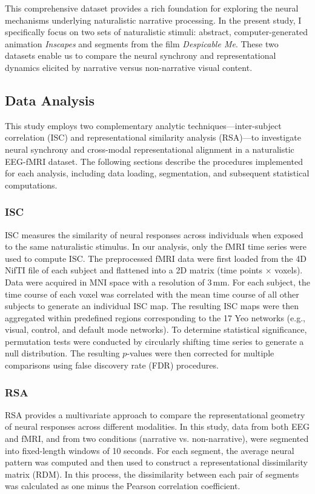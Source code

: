 \documentclass[stu,12pt,floatsintext]{apa7}
\begin{document}
This comprehensive dataset provides a rich foundation for exploring the neural mechanisms underlying naturalistic narrative processing. In the present study, I specifically focus on two sets of naturalistic stimuli: abstract, computer-generated animation \textit{Inscapes} and segments from the film \textit{Despicable Me}. These two datasets enable us to compare the neural synchrony and representational dynamics elicited by narrative versus non-narrative visual content.

\subsection{Data Analysis}
This study employs two complementary analytic techniques—inter-subject correlation (ISC) and representational similarity analysis (RSA)—to investigate neural synchrony and cross-modal representational alignment in a naturalistic EEG-fMRI dataset. The following sections describe the procedures implemented for each analysis, including data loading, segmentation, and subsequent statistical computations.

\subsubsection{ISC}
ISC measures the similarity of neural responses across individuals when exposed to the same naturalistic stimulus. In our analysis, only the fMRI time series were used to compute ISC. The preprocessed fMRI data were first loaded from the 4D NifTI file of each subject and flattened into a 2D matrix (time points $\times$ voxels). Data were acquired in MNI space with a resolution of 3\,mm. For each subject, the time course of each voxel was correlated with the mean time course of all other subjects to generate an individual ISC map. The resulting ISC maps were then aggregated within predefined regions corresponding to the 17 Yeo networks (e.g., visual, control, and default mode networks). To determine statistical significance, permutation tests were conducted by circularly shifting time series to generate a null distribution. The resulting $p$-values were then corrected for multiple comparisons using false discovery rate (FDR) procedures.

\subsubsection{RSA}
RSA provides a multivariate approach to compare the representational geometry of neural responses across different modalities. In this study, data from both EEG and fMRI, and from two conditions (narrative vs. non-narrative), were segmented into fixed-length windows of 10 seconds. For each segment, the average neural pattern was computed and then used to construct a representational dissimilarity matrix (RDM). In this process, the dissimilarity between each pair of segments was calculated as one minus the Pearson correlation coefficient.
\end{document}
